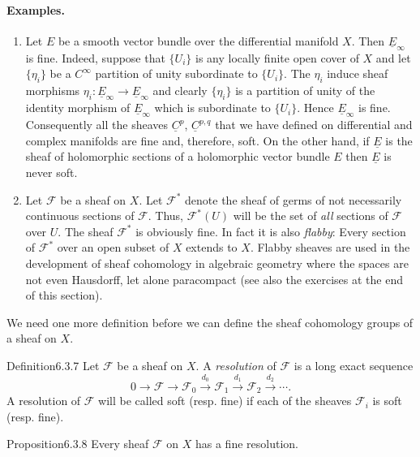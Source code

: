 \paragraph{Examples.}
\begin{enumerate}
\item Let $E$ be a smooth vector bundle over the differential manifold $X$. Then $\underline E_\infty$ is fine. Indeed, suppose that $\{U_i\}$ is any locally finite open cover of $X$ and let $\{\eta_i\}$ be a $C^\infty$ partition of unity subordinate to $\{U_i\}$. The $\eta_i$ induce sheaf morphisms $\eta_i:\underline E_\infty\to\underline E_\infty$ and clearly $\{\eta_i\}$ is a partition of unity of the identity morphism of $\underline E_\infty$ which is subordinate to $\{U_i\}$. Hence $\underline E_\infty$ is fine. Consequently all the sheaves $\underline C^p$, $\underline C^{p,q}$ that we have defined on differential and complex manifolds are fine and, therefore, soft. On the other hand, if $\underline E$ is the sheaf of holomorphic sections of a holomorphic vector bundle $E$ then $\underline E$ is never soft.
\item Let $\mathcal F$ be a sheaf on $X$. Let $\mathcal F^*$ denote the sheaf of germs of not necessarily continuous sections of $\mathcal F$. Thus, $\mathcal F^*(U)$ will be the set of \emph{all} sections of $\mathcal F$ over $U$. The sheaf $\mathcal F^*$ is obviously fine. In fact it is also \emph{flabby}: Every section of $\mathcal F^*$ over an open subset of $X$ extends
to $X$. Flabby sheaves are used in the development of sheaf cohomology in algebraic geometry where the spaces are not even Hausdorff, let alone paracompact (see also the exercises at the end of this section).
\end{enumerate}
We need one more definition before we can define the sheaf cohomology groups of a sheaf on $X$.
\begin{originaltheorem}{Definition}{6.3.7}
Let $\mathcal F$ be a sheaf on $X$. A \emph{resolution} of $\mathcal F$ is a long exact sequence
\[
0\to\mathcal F\to\mathcal F_0\xrightarrow{d_0}\mathcal F_1\xrightarrow{d_1}\mathcal F_2\xrightarrow{d_2}\cdots.
\]
A resolution of $\mathcal F$ will be called soft (resp. fine) if each of the sheaves $\mathcal F_i$ is soft (resp. fine).
\end{originaltheorem}
\begin{originaltheorem}{Proposition}{6.3.8}
Every sheaf $\mathcal F$ on $X$ has a fine resolution.
\end{originaltheorem}
